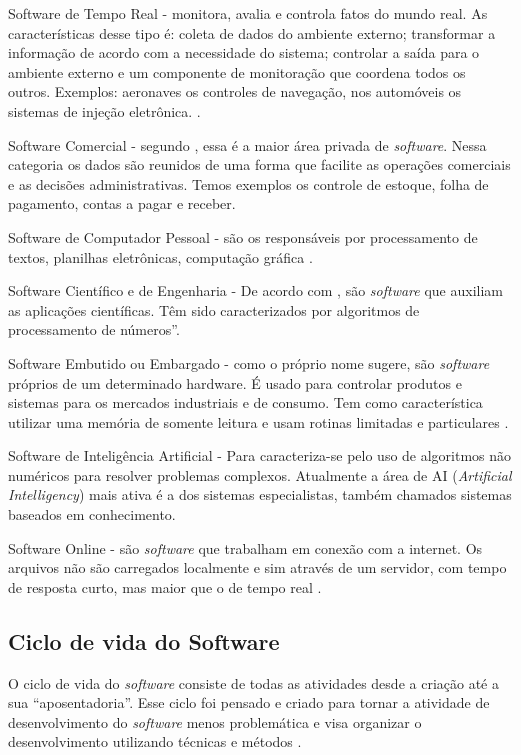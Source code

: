 Software de Tempo Real - monitora, avalia e controla fatos do mundo real. As características desse tipo é: coleta de dados do ambiente externo; transformar a informação de acordo com a necessidade do sistema; controlar a saída para o ambiente externo e um componente de monitoração que coordena todos os outros. Exemplos: aeronaves os controles de navegação, nos automóveis os sistemas de injeção eletrônica. \cite{PRESSMAN2007}.

Software Comercial - segundo , essa é a maior área privada de \textit{software}. Nessa categoria os dados são reunidos de uma forma que facilite as operações comerciais e as decisões administrativas. Temos exemplos os controle de estoque, folha de pagamento, contas a pagar e receber.

Software de Computador Pessoal - são os
responsáveis por processamento de textos, planilhas eletrônicas, computação gráfica \cite{MODESTOEOLIVEIRA2010}.

Software Científico e de Engenharia - De acordo com , são \textit{software} que auxiliam as aplicações científicas. Têm sido caracterizados por algoritmos de processamento de números”.

Software Embutido ou Embargado - como o próprio nome sugere, são \textit{software} próprios de um determinado hardware. É usado para controlar produtos e sistemas para os mercados industriais e de consumo. Tem como característica utilizar uma memória de somente leitura e usam rotinas limitadas e particulares \cite{MODESTOEOLIVEIRA2010}.

Software de Inteligência Artificial - Para  caracteriza-se pelo uso de algoritmos não numéricos para resolver problemas complexos. Atualmente a área de AI (\textit{Artificial Intelligency}) mais ativa é a dos sistemas especialistas, também chamados sistemas baseados em conhecimento.

Software Online - são \textit{software} que trabalham em conexão com a internet. Os arquivos não são carregados localmente e sim através de um servidor, com tempo de resposta curto, mas maior que o de tempo real \cite{MODESTOEOLIVEIRA2010}.


\subsection{Ciclo de vida do Software}

O ciclo de vida do \textit{software} consiste de todas as atividades desde a criação até a sua “aposentadoria”. Esse ciclo foi pensado e criado para tornar a atividade de desenvolvimento do \textit{software} menos problemática e visa organizar o desenvolvimento utilizando técnicas e métodos \cite{SOMMERVILLE2008}.


